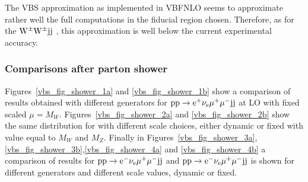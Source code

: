 The VBS approximation as implemented in {\sc VBFNLO} seems to approximate rather well the full computations in the fiducial region chosen.
Therefore, as for the ${\rm W}^\pm{\rm W}^\pm{\rm j}{\rm j}$ \cite{Anders:2018gfr}, this approximation is well below the current experimental accuracy.

\subsubsection*{Comparisons after parton shower}

Figures~\ref{vbs_fig_shower_1a} and \ref{vbs_fig_shower_1b} show a comparison of results obtained with different
generators for ${\rm p} {\rm p} \to {\rm e}^+  \nu_{\rm e}  \mu^+ \mu^- {\rm j} {\rm j}$ at LO with fixed scaled $\mu =
M_W$.
Figures~\ref{vbs_fig_shower_2a} and \ref{vbs_fig_shower_2b} show the same distribution for \MGAMC with different scale
choices, either dynamic or fixed with value equal to $M_W$ and $M_Z$.
Finally in Figures~\ref{vbs_fig_shower_3a},\ref{vbs_fig_shower_3b},\ref{vbs_fig_shower_4a} and \ref{vbs_fig_shower_4b} a
comparison of results for ${\rm p} {\rm p} \to {\rm e}^-  \nu_{\rm e}  \mu^+ \mu^- {\rm j} {\rm j}$ and ${\rm p} {\rm p}
\to {\rm e}^-  \nu_{\rm e}  \mu^+ \mu^- {\rm j} {\rm j}$ is shown for 
different generators and different scale values, dynamic or fixed.    

